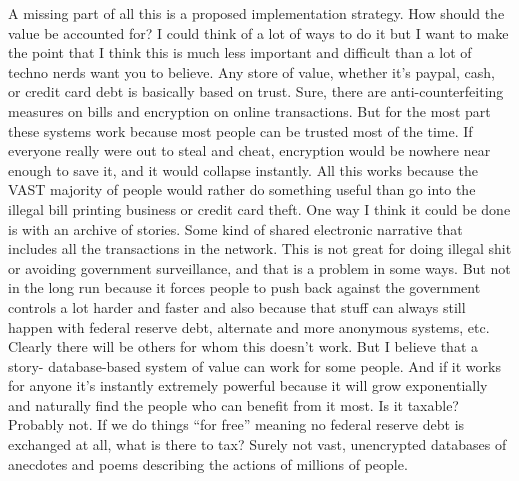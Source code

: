 A missing part of all this is a proposed implementation strategy. How
should the value be accounted for? I could think of a lot of ways to do
it but I want to make the point that I think this is much less important
and difficult than a lot of techno nerds want you to believe. Any store
of value, whether it's paypal, cash, or credit card debt is basically
based on trust. Sure, there are anti-counterfeiting measures on bills
and encryption on online transactions. But for the most part these
systems work because most people can be trusted most of the time. If
everyone really were out to steal and cheat, encryption would be nowhere
near enough to save it, and it would collapse instantly. All this works
because the VAST majority of people would rather do something useful
than go into the illegal bill printing business or credit card theft.
One way I think it could be done is with an archive of stories. Some
kind of shared electronic narrative that includes all the transactions
in the network. This is not great for doing illegal shit or avoiding
government surveillance, and that is a problem in some ways. But not in
the long run because it forces people to push back against the
government controls a lot harder and faster and also because that stuff
can always still happen with federal reserve debt, alternate and more
anonymous systems, etc. Clearly there will be others for whom this
doesn't work. But I believe that a story- database-based system of value
can work for some people. And if it works for anyone it's instantly
extremely powerful because it will grow exponentially and naturally find
the people who can benefit from it most. Is it taxable? Probably not. If
we do things ``for free'' meaning no federal reserve debt is exchanged
at all, what is there to tax? Surely not vast, unencrypted databases of
anecdotes and poems describing the actions of millions of people.

